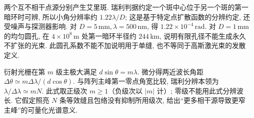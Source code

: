 两个互不相干点源分别产生艾里斑. 瑞利判据约定一个斑中心位于另一个斑的第一暗环时可辨, 所以小角分辨率约 $1.22\lambda/D$; 这是基于特定点扩散函数的分辨约定, 还受噪声与探测器影响. 对 $D=5\,\mathrm{mm},\lambda=500\,\mathrm{nm}$, 得 $1.22\times10^{-4}\,\mathrm{rad}$. 对 $D=1\,\mathrm{mm}$ 的均匀圆孔, 在 $4\times10^8\,\mathrm m$ 处第一暗环半径约 $244\,\mathrm{km}$, 说明有限孔径不能生成永久不扩张的光束. 此圆孔系数不能不加说明用于单缝, 也不等同于高斯激光束的发散定义.

衍射光栅在第 $m$ 级主极大满足 $d\sin\theta=m\lambda$. 微分得两近波长角距 $\Delta\theta\simeq m\Delta\lambda/(d\cos\theta)$. 与阵列主峰第一零点角宽比较, 瑞利分辨本领为 $\lambda/\Delta\lambda\simeq mN$. 此式取正级次 $m\ge1$（负级次以 $|m|$ 计）; 零级不能用此式分辨波长. 它假定照亮 $N$ 条等效缝且包络没有抑制所用级次, 给出“更多相干源导致更窄主峰”的可量化光谱意义.

